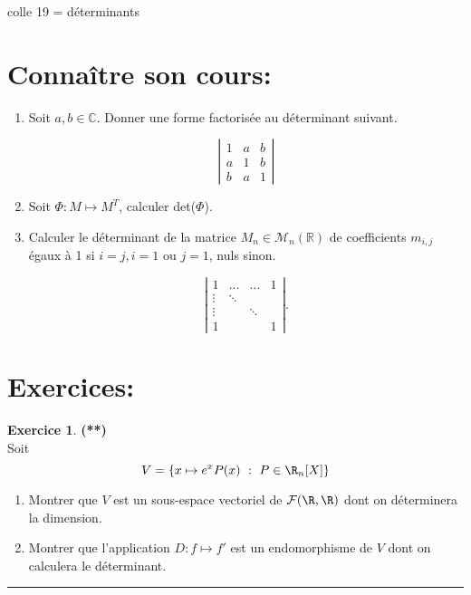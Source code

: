\documentclass[a4paper,11pt]{article}
\theoremstyle{definition}
\newtheorem{exo}{Exercice} %
\begin{document}
	
	
	\begin{center}
		\Large \sc colle 19 = déterminants
	\end{center}
\raggedright


\section*{Connaître son cours:}
\begin{enumerate}
	\item Soit $a, b \in \mathbb{C}$. Donner une forme factorisée au déterminant suivant.
	
	$$
	\left|\begin{array}{lll}
	1 & a & b \\
	a & 1 & b \\
	b & a & 1
	\end{array}\right|
	$$
	\item Soit $\Phi : M \longmapsto M^T$, calculer det($\Phi$).
	\item Calculer le déterminant de la matrice $M_{n} \in \mathscr{M}_{n}(\mathbb{R})$ de coefficients $m_{i, j}$ égaux à 1 si $i=j, i=1$ ou $j=1$, nuls sinon.
	
	$$
	\left|\begin{array}{cccc}
	1 & \ldots & \ldots & 1 \\
	\vdots & \ddots & & \\
	\vdots & & \ddots & \\
	1 & & & 1
	\end{array}\right| .
	$$
\end{enumerate}

\section*{Exercices:} 



\begin{exo}\textbf{(**)}\quad\\[0.25cm]
	
	Soit $$V =\{x \mapsto e^x P(x) \ : \  P \in \R_n [X] \} $$
	
	\begin{enumerate}
		\item Montrer que $V$ est un sous-espace vectoriel de $\mathcal F(\R, \R)$ dont on déterminera la dimension.
		\item Montrer que l'application $D : f \mapsto f'$ est un endomorphisme de $V$ dont on	calculera le déterminant.
	\end{enumerate}
 

	
	\centering
	\rule{1\linewidth}{0.6pt}
\end{exo}
	
\end{document}

